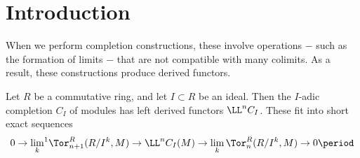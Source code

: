 
\chapter*{Introduction}%
\label{cha:introduction}

When we perform completion constructions,
these involve operations − such as the formation of limits −
that are not compatible with many colimits.
As a result, these constructions produce derived functors.

\begin{eg*}
	Let $ R $ be a commutative ring,
	and let $ I \subset R $ be an ideal.
	Then the $ I $-adic completion $ C_I $ of modules
	has left derived functors $ \LL^n C_I $.
	These fit into short exact sequences
	\[
		0 \to {\lim_{k}}^1 \Tor^R_{n+1}(R/I^k, M) \to
		\LL^n C_I(M) \to \lim_k \Tor^R_n(R/I^k, M)
		\to 0 \period
	\]
\end{eg*}






